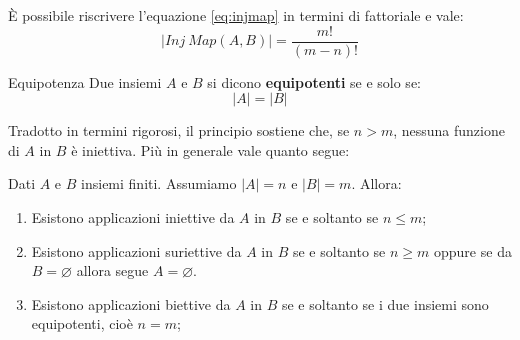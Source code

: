 \begin{corolbox}
	È possibile riscrivere l'equazione \ref{eq:injmap} in termini di fattoriale e vale:
	\begin{equation}
		|Inj \ Map(A,B)| = \frac{m!}{(m-n)!}
	\end{equation}
\end{corolbox}

\begin{defbox}{Equipotenza}
	Due insiemi $A$ e $B$ si dicono \textbf{equipotenti} se e solo se:
	\begin{equation}
		|A|=|B|
	\end{equation}
\end{defbox}


Tradotto in termini rigorosi, il principio sostiene che, se $n>m$, nessuna funzione di $A$ in $B$ è iniettiva. Più in generale vale quanto segue:

\begin{teorbox}
	Dati $A$ e $B$ insiemi finiti. Assumiamo $|A|=n$ e $|B|=m$. Allora:
	\begin{enumerate}
		\item Esistono applicazioni iniettive da $A$ in $B$ se e soltanto se $n \leq m$;
		\item Esistono applicazioni suriettive da $A$ in $B$ se e soltanto se $n \geq m$ oppure se da $B = \varnothing$ allora  segue $ A = \varnothing$.
		\item Esistono applicazioni biettive da $A$ in $B$ se e soltanto se i due insiemi sono equipotenti, cioè $n=m$;
	\end{enumerate}
\end{teorbox}

